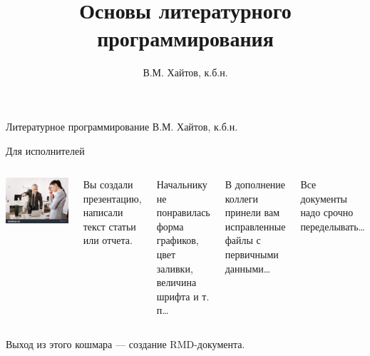 \documentclass[
  10pt,
  ignorenonframetext,
  aspectratio=169,t,xcolor=table]{beamer}
\title{Основы литературного программирования}
\author{В.М. Хайтов, к.б.н.}
\date{}
\newcommand{\columnsbegin}{\vspace{-0.5\baselineskip}\begin{columns}[t,onlytextwidth]}
\newcommand{\columnsend}{\end{columns}}
\begin{document}
\frame{\titlepage}

\begin{frame}{Литературное программирование}
\protect\hypertarget{ux43bux438ux442ux435ux440ux430ux442ux443ux440ux43dux43eux435-ux43fux440ux43eux433ux440ux430ux43cux43cux438ux440ux43eux432ux430ux43dux438ux435}{}
В.М. Хайтов, к.б.н.

\insertinstitute
\end{frame}

\begin{frame}{Для исполнителей}
\protect\hypertarget{ux434ux43bux44f-ux438ux441ux43fux43eux43bux43dux438ux442ux435ux43bux435ux439}{}
\columnsbegin
{}

\includegraphics[height=0.6\textheight,keepaspectratio]{./images/stock-photo-angry-boss-standing-opposite-his-secretary-631514021.jpg}


Вы создали презентацию, написали текст статьи или отчета.

Начальнику не понравилась форма графиков, цвет заливки, величина шрифта
и т. п\ldots{}

В дополнение коллеги принели вам исправленные файлы с первичными
данными\ldots{}

Все документы надо срочно переделывать\ldots{}

\columnsend

\centering

Выход из этого кошмара --- создание RMD-документа.
\end{frame}
\end{document}
